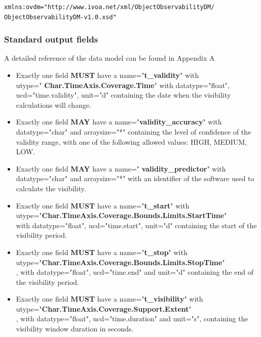 \documentclass[11pt,a4paper]{ivoatex/ivoa}
\begin{document}
\begin{lstlisting}[language=XML]
xmlns:ovdm="http://www.ivoa.net/xml/ObjectObservabilityDM/
ObjectObservabilityDM-v1.0.xsd"
\end{lstlisting}

\subsubsection{Standard output fields}
A detailed reference of the data model can be found in Appendix A

\begin{itemize}
\item {Exactly one field \textbf{MUST} have a name="\textbf{t\_validity}"
with\\ utype=" \textbf{Char.TimeAxis.Coverage.Time}" with
datatype="float", ucd="time.validity", unit="d" containing the date when the visibility calculations will change.}

\item {Exactly one field \textbf{MAY} have a name="\textbf{validity\_accuracy}" 
with datatype="char" and arraysize="*" containing the level of
confidence of the validity range, with one of the following allowed
values: HIGH, MEDIUM, LOW.}

\item {Exactly one field \textbf{MAY} have a name="\textbf{
validity\_predictor}" with datatype="char" and arraysize="*" with an
identifier of the software used to calculate the visibility.}

\item {Exactly one field \textbf{MUST} have a name="\textbf{t\_start}" with\\
utype="\textbf{Char.TimeAxis.Coverage.Bounds.Limits.StartTime}"\\ with
datatype="float",  ucd="time.start", unit="d" containing the start of the visibility period.}

\item {Exactly one field \textbf{MUST} have a name="\textbf{t\_stop}" with\\
utype="\textbf{Char.TimeAxis.Coverage.Bounds.Limits.StopTime}"\\, with
datatype="float", ucd="time.end" and unit="d" containing the end of the visibility period.}

\item {Exactly one field \textbf{MUST} have a name="\textbf{t\_visibility}"
with\\ utype="\textbf{Char.TimeAxis.Coverage.Support.Extent}"\\, with
datatype="float", ucd="time.duration" and unit="s", containing the visibility window duration in seconds.}


\end{itemize}
\end{document}
